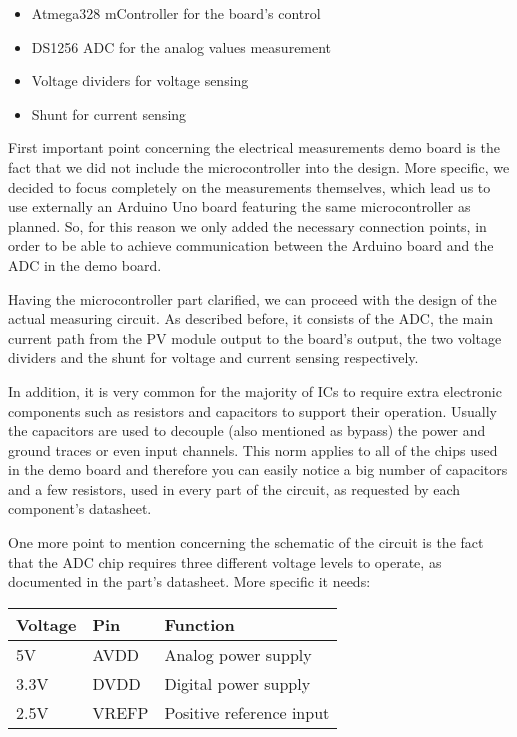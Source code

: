 \begin{itemize}
    \item Atmega328 mController for the board's control
    \item DS1256 ADC for the analog values measurement
    \item Voltage dividers for voltage sensing
    \item Shunt for current sensing
\end{itemize}

First important point concerning the electrical measurements demo board is the fact that we did not include the microcontroller into the design. More specific, we decided to focus completely on the measurements themselves, which lead us to use externally an Arduino Uno board featuring the same microcontroller as planned. So, for this reason we only added the necessary connection points, in order to be able to achieve communication between the Arduino board and the ADC in the demo board.

Having the microcontroller part clarified, we can proceed with the design of the actual measuring circuit. As described before, it consists of the ADC, the main current path from the PV module output to the board's output, the two voltage dividers and the shunt for voltage and current sensing respectively.

In addition, it is very common for the majority of ICs to require extra electronic components such as resistors and capacitors to support their operation. Usually the capacitors are used to decouple (also mentioned as bypass) the power and ground traces or even input channels. This norm applies to all of the chips used in the demo board and therefore you can easily notice a big number of capacitors and a few resistors, used in every part of the circuit, as requested by each component's datasheet.

One more point to mention concerning the schematic of the circuit is the fact that the ADC chip requires three different voltage levels to operate, as documented in the part's datasheet. More specific it needs:

\begin{center}
\begin{tabular}{ l l l } 
 Voltage & Pin & Function \\ \hline
 5V & AVDD & Analog power supply \\ 
 3.3V & DVDD & Digital power supply \\
 2.5V & VREFP & Positive reference input \\ 
\end{tabular}
\end{center}

